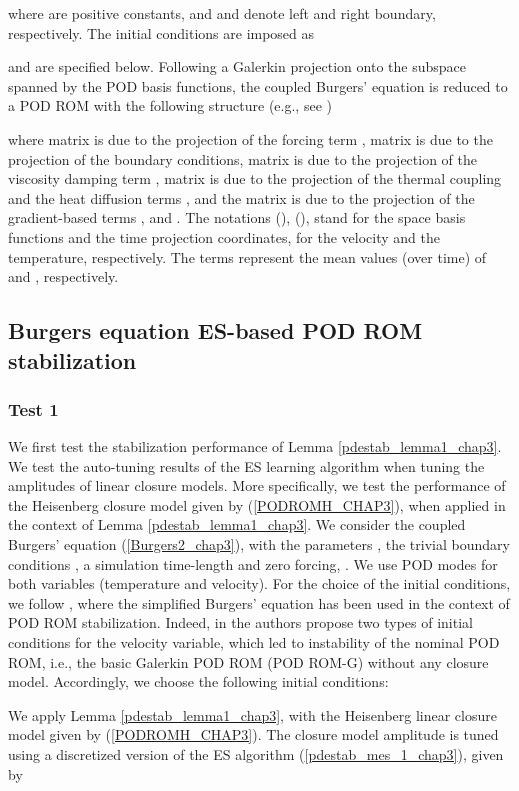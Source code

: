 \documentclass[letterpaper,conference,onecolumn,11pt]{IEEEtran}
\begin{document}
where  are positive constants, and  and 
denote left and right boundary, respectively. The initial conditions
are imposed as

and are specified below. Following a Galerkin projection onto the
subspace spanned by the POD basis functions, the coupled Burgers'
equation is reduced to a POD ROM with the following structure (e.g.,
see \cite{B_master_011})

where matrix  is due to the projection of the forcing term
, matrix  is due to the projection of the boundary
conditions, matrix  is due to the projection of the viscosity
damping term ,
matrix  is due to the projection of the thermal
coupling and the heat diffusion terms , and the
matrix  is due to the projection of the gradient-based terms
, and . The notations 
(),  (),
stand for the space basis functions and the time projection
coordinates, for the velocity and the temperature, respectively.
The terms  represent the mean values (over
time) of  and , respectively.

\subsection{Burgers equation
ES-based POD ROM stabilization} \subsubsection{Test 1} We first
test the stabilization performance of Lemma
\ref{pdestab_lemma1_chap3}. We test the auto-tuning results of the
ES learning algorithm when tuning the amplitudes of linear closure
models. More specifically, we test the performance of the
Heisenberg closure model given by (\ref{PODROMH_CHAP3}), when
applied in the context of Lemma \ref{pdestab_lemma1_chap3}.
 We consider the coupled Burgers'
equation (\ref{Burgers2_chap3}), with the parameters
,  the
trivial boundary conditions , a simulation
time-length  and zero forcing,  . We use  POD
modes for both variables (temperature and velocity). For the
choice of the initial conditions, we follow \cite{SI13}, where the
simplified Burgers' equation has been used in the context of POD
ROM stabilization. Indeed, in \cite{SI13} the authors propose two
types of initial conditions for the velocity variable, which led
to instability of the nominal POD ROM, i.e., the basic Galerkin
POD ROM (POD ROM-G) without any closure model. Accordingly, we
choose the following initial conditions:


We apply Lemma \ref{pdestab_lemma1_chap3}, with the Heisenberg
linear closure model given by (\ref{PODROMH_CHAP3}). The closure
model amplitude  is tuned using a discretized version of
the ES algorithm (\ref{pdestab_mes_1_chap3}), given by
\end{document}
